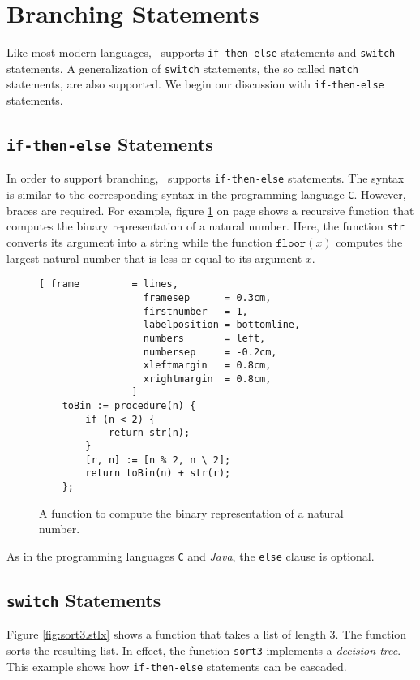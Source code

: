 \section{Branching Statements}
Like most modern languages, \setlx\ supports \texttt{if-then-else} statements and
\texttt{switch} statements.  A generalization of \texttt{switch} statements, the so called
\texttt{match} statements, are also supported. We begin our discussion with
\texttt{if-then-else} statements.

\subsection{\texttt{if-then-else} Statements}
In order to support branching, \setlx\ supports \texttt{if-then-else} statements.  The syntax is 
similar to the corresponding syntax in the programming language \texttt{C}.  However, braces are
required.  For example, figure \ref{fig:toBin.stlx} on page \pageref{fig:toBin.stlx} shows a
recursive function that computes the binary representation of a
natural number.  Here, the function \texttt{str} converts its argument
into a string while the function $\texttt{floor}(x)$ computes the largest
natural number that is less or equal to its argument $x$.

\begin{figure}[!ht]
\centering
\begin{Verbatim}[ frame         = lines, 
                  framesep      = 0.3cm, 
                  firstnumber   = 1,
                  labelposition = bottomline,
                  numbers       = left,
                  numbersep     = -0.2cm,
                  xleftmargin   = 0.8cm,
                  xrightmargin  = 0.8cm,
                ]
    toBin := procedure(n) {
        if (n < 2) {
            return str(n);
        }
        [r, n] := [n % 2, n \ 2];
        return toBin(n) + str(r);
    };
\end{Verbatim}
\vspace*{-0.3cm}
\caption{A function to compute the binary representation of a natural number.}
\label{fig:toBin.stlx}
\end{figure}

As in the programming languages \texttt{C} and \textsl{Java}, the
\texttt{else} clause is optional.

\subsection{\texttt{switch} Statements}
Figure \ref{fig:sort3.stlx} shows a function that takes a list of length 3.  The function sorts
the resulting list.  In effect, the function \texttt{sort3} implements a 
\href{http://en.wikipedia.org/wiki/Decision_tree}{\emph{decision tree}}.
This example shows how \texttt{if-then-else} statements can be cascaded.

